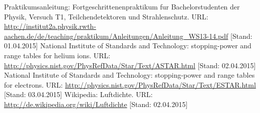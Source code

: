 \documentclass{../Misc/MontavonLaTeX/Montavon}
\begin{document}
\newpage
\begin{thebibliography}{xxxx}
 Praktikumsanleitung: Fortgeschrittenenpraktikum fur Bachelorstudenten der Physik, Versuch T1, Teilchendetektoren und Strahlenschutz. URL: \url{http://institut2a.physik.rwth-aachen.de/de/teaching/praktikum/Anleitungen/Anleitung_WS13-14.pdf} [Stand: 01.04.2015]
 National Institute of Standards and Technology: stopping-power and range tables for helium ions. URL: \url{http://physics.nist.gov/PhysRefData/Star/Text/ASTAR.html} [Stand: 02.04.2015]
 National Institute of Standards and Technology: stopping-power and range tables for electrons. URL: \url{http://physics.nist.gov/PhysRefData/Star/Text/ESTAR.html} [Stand: 03.04.2015]
 Wikipedia: Luftdichte. URL: \url{http://de.wikipedia.org/wiki/Luftdichte} [Stand: 02.04.2015]
\end{thebibliography}
\end{document}
